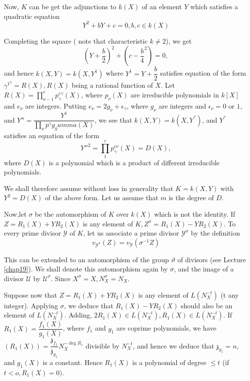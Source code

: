 Now, $K$ can be get the adjunctions to $k(X)$ of an element $Y$ which
satisfies a quadratic equation 
$$
Y^2 + bY + c = 0, b, c \in k(X)
$$

Completing the square ( note that characteristic $k \neq 2$), we get 
$$
\left(Y + \frac{b}{2}\right)^2 + \left(c - \frac{b}{4}^2\right) = 0,
$$
and hence $k(X, Y) = k (X, Y^1)$ where $Y^1 = Y + \dfrac{b}{2}$
satisfies equation of the form $\gamma^{1^2} = R(X), R(X)$ being a rational
function of $X$. Let $R(X) = \prod\limits^{r}_{\nu - 1} p_\gamma ^{e
  \gamma}(X)$, where $p_\nu (X)$ are irreducible polynomials in $k[X]$
and $e_\nu$ are integers. Putting $e_\nu = 2g_\nu + \epsilon_\gamma$, where
$g_\nu$ are integers and $\epsilon_\nu = 0$ or $1$, and $Y'' =
\dfrac{Y^1}{\prod\limits_\nu p^\gamma g_gamma (X)}$, we see that $k (X, Y) = k (X,
Y^{''})$, and $Y^{''}$ satisfies an equation of the form 
$$
Y''^{2} = \prod^{r}_{1} p_{\gamma}^{\epsilon \nu}(X) = D(X),
$$
where $D(X)$ is a polynomial which is a product of different
irreducible polynomials. 

We shall therefore assume without loss in generality that $K = k (X,
Y)$ with $Y^2 = D(X)$ of the above form. Let us assume that $m$ is the
degree of $D$. 

Now,\pageoriginale let $\sigma$ be the automorphism of $K$ over $k(X)$ which is not
the identity. If $Z = R_1 (X) + Y R_2(X)$ is any element of $K,
Z^\sigma = R_1 (X) - YR_2 (X)$. To every prime divisor $\mathscr{Y}$
of $K$, let us associate a prime divisor $\mathscr{Y}^{\sigma}$ by the
definition 
$$
v_{\mathscr{Y}^\sigma}(Z) = v_{\mathscr{Y}}(\sigma^{-1} Z)
$$

This can be extended to an automorphism of the group $\vartheta$ of
divisors (see Lecture \ref{chap19}). We shall denote this automorphism again by
$\sigma$, and the image of a divisor $\mathscr{U}$ by
$\mathscr{U}^\sigma$. Since $X^\sigma = X, N^\sigma_{X} =
N_{X}$. 

Suppose now that $Z = R_1 (X) + YR_2 (X)$ is any element of
$L(N^{-t}_{X})$ (t any integer). Applying $\sigma$, we deduce
that $R_1 (X) - YR_2 (X)$ should also be an element of
$L(N_{X}^{-t})$. Adding, $2R_1 (X) \in L (N^{-t}_{X}),
R_1 (X) \in L (N^{-t}_{X})$. If $R_1 (X) = \dfrac{f_1 (X)}{g_1
  (X)}$, where $f_1$ and $g_1$ are coprime polynomials, we have
$(R_1(X)) = \dfrac{\mathfrak{z}_{f_1}}{\mathfrak{z}_{g_1}} N_{X}^
{-\deg R_1}$ divisible by $N^{-t}_{X}$, and hence we deduce
that $\mathfrak{z}_{g_1} = n$, and $g_1 (X)$ is a constant. Hence
$R_1(X)$ is a polynomial of degree $\le t$ (if $t < o, R_1 (X) = 0)$. 

